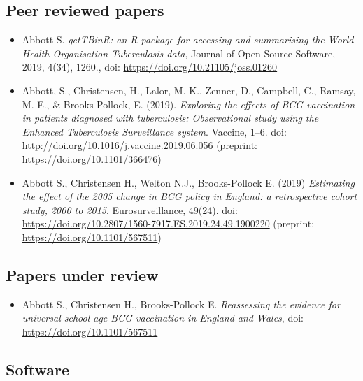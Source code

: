 \documentclass[11pt,twoside]{bristolthesis}
\providecommand{\tightlist}{%
  \setlength{\itemsep}{0pt}\setlength{\parskip}{0pt}}
\begin{document}
  \hypertarget{peer-reviewed-papers}{%
  \subsection{Peer reviewed papers}\label{peer-reviewed-papers}}
  \begin{itemize}
  \item
    Abbott S. \emph{getTBinR: an R package for accessing and summarising the World Health Organisation Tuberculosis data},
    Journal of Open Source Software, 2019, 4(34), 1260., doi: \url{https://doi.org/10.21105/joss.01260}
  \item
    Abbott, S., Christensen, H., Lalor, M. K., Zenner, D., Campbell, C., Ramsay, M. E., \& Brooks-Pollock, E. (2019). \emph{Exploring the effects of BCG vaccination in patients diagnosed with tuberculosis: Observational study using the Enhanced Tuberculosis Surveillance system}. Vaccine, 1--6. doi: \url{http://doi.org/10.1016/j.vaccine.2019.06.056} (preprint: \url{https://doi.org/10.1101/366476})
  \item
    Abbott S., Christensen H., Welton N.J., Brooks-Pollock E. (2019) \emph{Estimating the effect of the 2005 change in BCG policy in England: a retrospective cohort study, 2000 to 2015}. Eurosurveillance, 49(24). doi: \url{https://doi.org/10.2807/1560-7917.ES.2019.24.49.1900220} (preprint: \url{https://doi.org/10.1101/567511})
  \end{itemize}
  \hypertarget{papers-under-review}{%
  \subsection{Papers under review}\label{papers-under-review}}
  \begin{itemize}
  \tightlist
  \item
    Abbott S., Christensen H., Brooks-Pollock E. \emph{Reassessing the evidence for universal school-age BCG vaccination in England and Wales}, doi: \url{https://doi.org/10.1101/567511}
  \end{itemize}
  \hypertarget{software}{%
  \subsection{Software}\label{software}}
  
\end{document}
